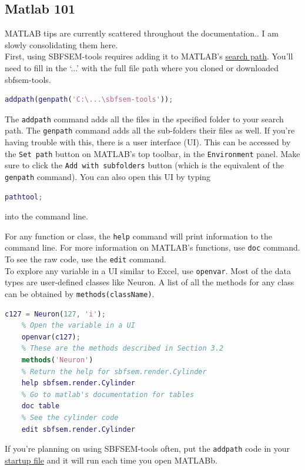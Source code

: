 \documentclass[12pt]{exam}
\begin{document}
	\subsection{Matlab 101}\label{matlab101}
	MATLAB tips are currently scattered throughout the documentation.. I am slowly consolidating them here.\\
	First, using SBFSEM-tools requires adding it to MATLAB's \href{https://www.mathworks.com/help/matlab/ref/addpath.html}{search path}. You'll need to fill in the `...' with the full file path where you cloned or downloaded sbfsem-tools.
	\begin{lstlisting}[language=matlab]
	addpath(genpath('C:\...\sbfsem-tools'));\end{lstlisting}
	The \texttt{addpath} command adds all the files in the specified folder to your search path. The \texttt{genpath} command adds all the sub-folders their files as well. If you're having trouble with this, there is a user interface (UI). This can be accessed by the \texttt{Set path} button on MATLAB's top toolbar, in the \texttt{Environment} panel. Make sure to click the \texttt{Add with subfolders} button (which is the equivalent of the \texttt{genpath} command). You can also open this UI by typing
	\begin{lstlisting}[language=matlab]
	pathtool;\end{lstlisting}
	into the command line.
	
	For any function or class, the \texttt{help} command will print information to the command line. For more information on MATLAB's functions, use \texttt{doc} command. To see the raw code, use the \texttt{edit} command.\\
	To explore any variable in a UI similar to Excel, use \texttt{openvar}. Most of the data types are user-defined classes like Neuron. A list of all the methods for any class can be obtained by \texttt{methods(className)}.
	\begin{lstlisting}[language=matlab]
	c127 = Neuron(127, 'i');
	% Open the variable in a UI
	openvar(c127);
	% These are the methods described in Section 3.2
	methods('Neuron')
	% Return the help for sbfsem.render.Cylinder
	help sbfsem.render.Cylinder
	% Go to matlab's documentation for tables
	doc table
	% See the cylinder code
	edit sbfsem.render.Cylinder\end{lstlisting}

	If you're planning on using SBFSEM-tools often, put the \texttt{addpath} code in your 
	\href{https://www.mathworks.com/help/matlab/ref/startup.html}{startup file} and it will run each time you open MATLABb. 
\end{document}
